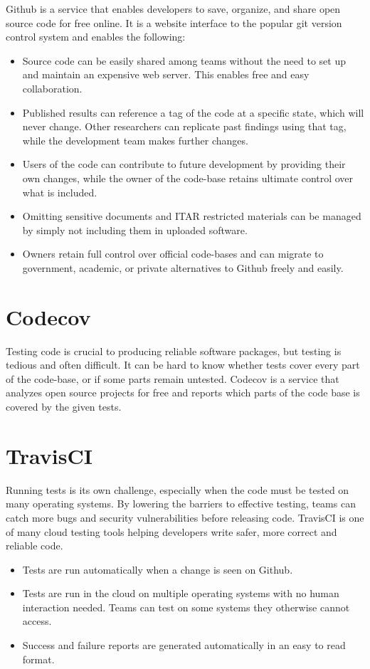 \documentclass[12pt, letterpaper]{article}
\begin{document}
  Github\cite{github} is a service that enables developers to save, organize,
  and share open source code for free online. It is a website interface to the
  popular git version control system and enables the following:
  \begin{itemize}
      \item Source code can be easily shared among teams without the need to
        set up and maintain an expensive web server. This enables free and
        easy collaboration.
      \item Published results can reference a tag of the code at a specific
        state, which will never change. Other researchers can replicate past
        findings using that tag,  while the development team makes further
        changes.
      \item Users of the code can contribute to future development by providing
        their own changes, while the owner of the code-base retains ultimate
        control over what is included.
      \item Omitting sensitive documents and ITAR restricted materials can be
        managed by simply not including them in uploaded software.
      \item Owners retain full control over official code-bases and can migrate
        to government, academic, or private alternatives to Github freely and
        easily.
  \end{itemize}

  \section*{\small Codecov}

  Testing code is crucial to producing reliable software packages,
  but testing is tedious and often difficult. It can be hard to know whether
  tests cover every part of the code-base, or if some parts remain untested.
  Codecov\cite{codecov} is a service that analyzes open source projects for
  free and reports which parts of the code base is covered by the given tests.

  \section*{\small TravisCI}

  Running tests is its own challenge, especially when the code
  must be tested on many operating systems. By lowering the barriers to
  effective testing, teams can catch more bugs and security vulnerabilities
  before releasing code. TravisCI\cite{travisci} is one of many cloud testing
  tools helping developers write safer, more correct and reliable code.
  \begin{itemize}
      \item Tests are run automatically when a change is seen on Github.
      \item Tests are run in the cloud on multiple operating systems with no
        human interaction needed. Teams can test on some systems they otherwise
        cannot access.
      \item Success and failure reports are generated automatically in an easy
        to read format.
  \end{itemize}
\end{document}
